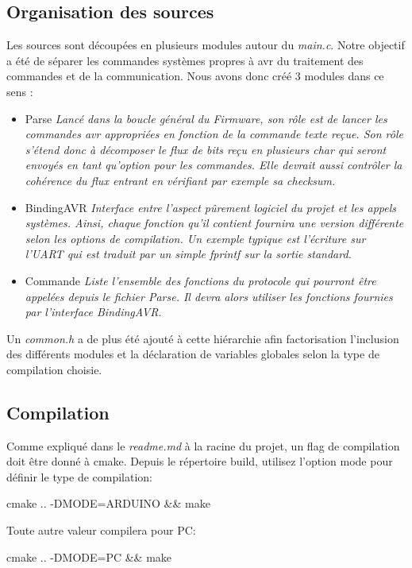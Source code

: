 \subsection{Organisation des sources}
Les sources sont découpées en plusieurs modules autour du \textit{main.c}. Notre
objectif a été de séparer les commandes systèmes propres à avr du traitement des commandes
et de la communication. Nous avons donc créé 3 modules dans ce sens :
\begin{itemize}
\item Parse 
  { 
    \it 
    Lancé dans la boucle général du Firmware, son rôle est de lancer
    les commandes avr appropriées en fonction de la commande texte reçue. Son rôle s'étend 
    donc à décomposer le flux de bits reçu en plusieurs char qui seront envoyés en tant 
    qu'option pour les commandes. Elle devrait aussi contrôler la cohérence du flux entrant
    en vérifiant par exemple sa checksum.
  }
\item BindingAVR
  {
    \it
    Interface entre l'aspect pûrement logiciel du projet et les appels systèmes. Ainsi,
    chaque fonction qu'il contient fournira une version différente selon les options de 
    compilation. Un exemple typique est l'écriture sur l'UART qui est traduit par un 
    simple fprintf sur la sortie standard.
  }
\item Commande
  {
    \it
    Liste l'ensemble des fonctions du protocole qui pourront être appelées depuis le fichier 
    Parse. Il devra alors utiliser les fonctions fournies par l'interface BindingAVR.
  }
\end{itemize}

Un \textit{common.h} a de plus été ajouté à cette hiérarchie afin factorisation l'inclusion des
différents modules et la déclaration de variables globales selon la type de compilation
choisie.\\


\subsection{Compilation}
Comme expliqué dans le \textit{readme.md} à la racine du projet, un flag de compilation doit
être donné à cmake. Depuis le répertoire build, utilisez l'option mode pour définir le type
de compilation:
\begin{center} cmake .. -DMODE=ARDUINO \&\& make\end{center}

Toute autre valeur compilera pour PC:
\begin{center} cmake .. -DMODE=PC \&\& make\end{center}

